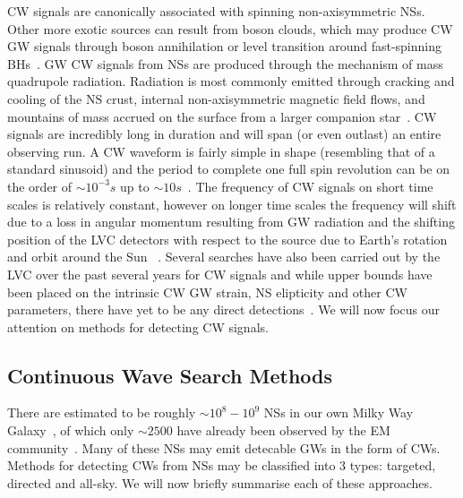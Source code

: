 \ac{CW} signals are canonically associated with spinning non-axisymmetric
\ac{NS}s. Other more exotic sources can result from boson clouds, which 
may produce \ac{CW} \ac{GW} signals through boson annihilation or level 
transition around fast-spinning \ac{BH}s~\cite{1712.05897}. \ac{GW} 
\ac{CW} signals from \ac{NS}s are produced through the mechanism of 
mass quadrupole 
radiation. Radiation is most commonly emitted through 
cracking and cooling of the \ac{NS} crust, internal non-axisymmetric magnetic 
field flows, and mountains of mass accrued on the surface from a larger companion star~\cite{1712.05897}. \ac{CW} signals are incredibly long in 
duration and will span (or even outlast) an entire observing run. 
A \ac{CW} waveform is fairly simple in shape (resembling that 
of a standard sinusoid) and 
the period to complete one full spin revolution can be on the order 
of $\sim 10^{-3}s$ up to $\sim 10s$~\cite{Manchester_2005}. The frequency 
of \ac{CW} signals on short time scales is relatively constant, 
however on longer time scales the frequency will shift due to a  
loss in angular momentum resulting from \ac{GW} radiation and the 
shifting position of the \ac{LVC} detectors with respect 
to the source due to Earth's rotation and orbit around the Sun ~\cite{Sathyaprakash2009}.
Several searches have also been carried 
out by the \ac{LVC} over the past several years for \ac{CW} signals 
and while upper bounds have been placed on the intrinsic \ac{CW} 
\ac{GW} strain, \ac{NS} elipticity and other \ac{CW} parameters, 
there have yet to be any direct 
detections~\cite{PhysRevD.103.064017,1707.02669}. We will now focus 
our attention on methods for detecting \ac{CW} signals.

\subsection{Continuous Wave Search Methods}

There are estimated to be roughly $\sim 10^{8} - 10^{9}$ \ac{NS}s in our own Milky Way Galaxy~\cite{2007coaw.book.....C}, of which only $\sim 2500$ have already 
been observed by the \ac{EM} community~\cite{1712.05897,2005AJ....129.1993M}. 
Many of these \ac{NS}s may emit detecable \ac{GW}s in the form of 
\ac{CW}s.
Methods for detecting \ac{CW}s from \ac{NS}s may be classified into 3 types: 
targeted, directed and all-sky. We will now briefly summarise each of 
these approaches. 

